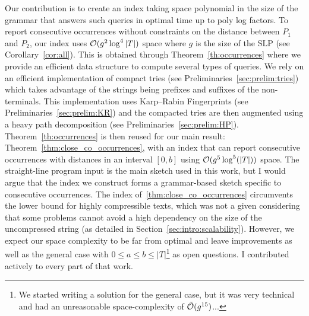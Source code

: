 Our contribution is to create an index taking space polynomial in the size of the grammar that answers such queries in optimal time up to poly log factors.
To report consecutive occurrences without constraints on the distance between $P_1$ and $P_2$, our index uses $\mathcal{O}(g^2\log^4|T|)$ space where $g$ is the size of the SLP (see Corollary~\ref{cor:all}).
This is obtained through Theorem~\ref{th:occurrences} where we provide an efficient data structure to compute several types of queries. We rely on an efficient implementation of compact tries (see Preliminaries~\ref{sec:prelim:tries}) which takes advantage of the strings being prefixes and suffixes of the non-terminals. This implementation uses Karp--Rabin Fingerprints (see Preliminaries~\ref{sec:prelim:KR}) and the compacted tries are then augmented using a heavy path decomposition (see Preliminaries~\ref{sec:prelim:HP}).
Theorem~\ref{th:occurrences} is then reused for our main result: Theorem~\ref{thm:close_co_occurrences}, with an index that can report consecutive occurrences with distances in an interval $[0,b]$ using $\mathcal{O} (g^5\log^5(|T|))$ space.
The straight-line program input is the main sketch used in this work, but I would argue that the index we construct forms a grammar-based sketch specific to consecutive occurrences.
The index of~\ref{thm:close_co_occurrences} circumvents the lower bound for highly compressible texts, which was not a given considering that some problems cannot avoid a high dependency on the size of the uncompressed string (as detailed in Section~\ref{sec:intro:scalability}). However, we expect our space complexity to be far from optimal and leave improvements as well as the general case with $0 \leq a \leq b \leq |T|$\footnote{We started writing a solution for the general case, but it was very technical and had an unreasonable space-complexity of $\tilde {\mathcal{O}}(g^{15})$...} as open questions. I contributed actively to every part of that work.

